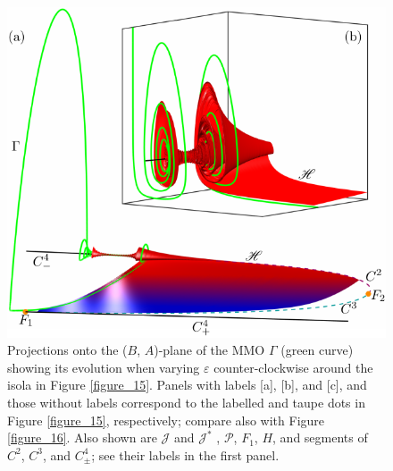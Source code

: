 \documentclass{ws-ijbc}
\begin{document}
\begin{figure}[H]
\centering
\includegraphics[]{./figures/MKMO_17.pdf}
\caption{Projections onto the ($B$, $A$)-plane of the MMO $\Gamma$ (green curve) showing its evolution when varying $\varepsilon$ counter-clockwise around the isola in Figure \ref{figure_15}.  Panels with labels [a], [b], and [c], and those without labels correspond to the labelled and taupe dots in Figure \ref{figure_15}, respectively; compare also with Figure \ref{figure_16}.  Also shown are $\mathscr{J}$ and $\mathscr{J}^*$ , $\mathscr{P}$, $F_1$, $H$, and segments of $C^2$, $C^3$, and $C^4_\pm$; see their labels in the first panel.}
\label{figure_17}
\end{figure}
\end{document}
